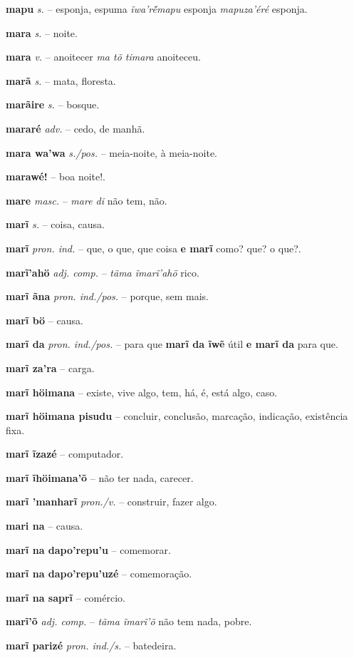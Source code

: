 \textbf{mapu} \textit{s.} -- esponja, espuma  \textit{ĩwa'ré̃mapu} esponja  \textit{mapuza'éré} esponja.

\textbf{mara} \textit{s.} -- noite.

\textbf{mara} \textit{v.} -- anoitecer  \textit{ma tõ timara} anoiteceu.

\textbf{marã} \textit{s.} -- mata, floresta.

\textbf{marãire} \textit{s.} -- bosque.

\textbf{mararé} \textit{adv.} -- cedo, de manhã.

\textbf{mara wa'wa} \textit{s./pos.} -- meia-noite, à meia-noite.

\textbf{marawé!} -- boa noite!.

\textbf{mare} \textit{masc.} -- \textit{mare di} não tem, não.

\textbf{marĩ} \textit{s.} -- coisa, causa.

\textbf{marĩ} \textit{pron. ind.} -- que, o que, que coisa  \textbf{e marĩ} como? que? o que?.

\textbf{marĩ'ahö} \textit{adj. comp.} -- \textit{tãma ĩmarĩ'ahö} rico.

\textbf{marĩ ãna} \textit{pron. ind./pos.} -- porque, sem mais.

\textbf{marĩ bö} -- causa.

\textbf{marĩ da} \textit{pron. ind./pos.} -- para que  \textbf{marĩ da ĩwẽ} útil  \textbf{e marĩ da} para que.

\textbf{marĩ za'ra} -- carga.

\textbf{marĩ höimana} -- existe, vive algo, tem, há, é, está algo, caso.

\textbf{marĩ höimana pisudu} -- concluir, conclusão, marcação, indicação, existência fixa.

\textbf{marĩ ĩzazé} -- computador.

\textbf{marĩ ĩhöimana'õ} -- não ter nada, carecer.

\textbf{marĩ 'manharĩ} \textit{pron./v.} -- construir, fazer algo.

\textbf{mari na} -- causa.

\textbf{marĩ na dapo'repu'u} -- comemorar.

\textbf{marĩ na dapo'repu'uzé} -- comemoração.

\textbf{marĩ na saprĩ} -- comércio.

\textbf{marĩ'õ} \textit{adj. comp.} -- \textit{tãma ĩmarĩ'õ} não tem nada, pobre.

\textbf{marĩ parizé} \textit{pron. ind./s.} -- batedeira.

